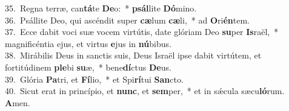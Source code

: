 {35.~}Regna terræ, can\textbf{tá}te \textbf{De}o:~* \textbf{psál}lite \textbf{Dó}mino.\\
{36.~}Psállite Deo, qui ascéndit super \textbf{cæ}lum \textbf{cæ}li,~* ad \textbf{O}ri\textbf{én}tem.\\
{37.~}Ecce dabit voci suæ vocem virtútis, date glóriam Deo \textbf{su}per \textbf{Is}raël,~* magnificéntia ejus, et virtus \textbf{e}jus in \textbf{nú}bibus.\\
{38.~}Mirábilis Deus in sanctis suis, Deus Israël ipse dabit virtútem, et fortitúdinem \textbf{ple}bi \textbf{su}æ,~* bene\textbf{dí}ctus \textbf{De}us.\\
{39.~}Glória \textbf{Pa}tri, et \textbf{Fí}lio,~* et Spi\textbf{rí}tui \textbf{San}cto.\\
{40.~}Sicut erat in princípio, et \textbf{nunc}, et \textbf{sem}per,~* et in sǽcula sæcu\textbf{ló}rum. \textbf{A}men.\\
